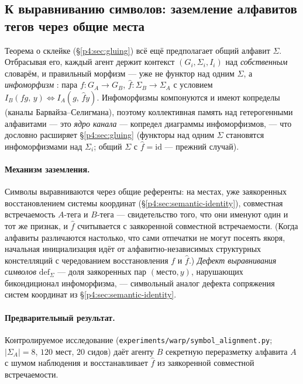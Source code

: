 \documentclass{article}
\newcommand{\method}[1]{\texttt{#1}}
\begin{document}
\subsection{К выравниванию символов: заземление алфавитов тегов через общие места}
\label{p4:sec:symbol-alignment}

Теорема о склейке (\S\ref{p4:sec:gluing}) всё ещё предполагает общий алфавит
$\Sigma$. Отбрасывая его, каждый агент держит контекст $(G_i,\Sigma_i,I_i)$
над \emph{собственным} словарём, и правильный морфизм --- уже не функтор над
одним $\Sigma$, а \emph{инфоморфизм} \citep{barwise1997information}: пара
$f:G_A\!\to\!G_B$, $\hat f:\Sigma_B\!\to\!\Sigma_A$ с условием
$I_B(f g,\,y)\Leftrightarrow I_A(g,\,\hat f y)$. Инфоморфизмы компонуются и
имеют копределы (каналы Барвайза--Селигмана), поэтому коллективная память над
гетерогенными алфавитами --- это \emph{ядро канала} --- копредел диаграммы
инфоморфизмов, --- что дословно расширяет \S\ref{p4:sec:gluing} (функторы над
одним $\Sigma$ становятся инфоморфизмами над $\Sigma_i$; общий $\Sigma$ с
$\hat f=\mathrm{id}$ --- прежний случай).

\paragraph{Механизм заземления.} Символы выравниваются через общие референты:
на местах, уже заякоренных восстановлением системы координат
(\S\ref{p4:sec:semantic-identity}), совместная встречаемость $A$-тега и $B$-тега
--- свидетельство того, что они именуют один и тот же признак, и $\hat f$
считывается с заякоренной совместной встречаемости. (Когда алфавиты
различаются настолько, что сами отпечатки не могут посеять якоря, начальная
инициализация идёт от алфавитно-независимых структурных констелляций с
чередованием восстановления $f$ и $\hat f$.) \emph{Дефект выравнивания
символов} $\mathrm{def}_\Sigma$ --- доля заякоренных пар
$(\text{место},y)$, нарушающих бикондиционал инфоморфизма, --- символьный
аналог дефекта сопряжения систем координат из \S\ref{p4:sec:semantic-identity}.

\paragraph{Предварительный результат.} Контролируемое исследование
(\method{experiments/warp/symbol\_alignment.py}; $|\Sigma_A|{=}8$, $120$ мест,
$20$ сидов) даёт агенту $B$ секретную переразметку алфавита $A$ с шумом
наблюдения и восстанавливает $\hat f$ из заякоренной совместной
встречаемости.
\end{document}

